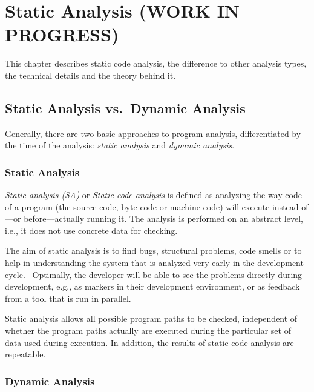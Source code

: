 \chapter{Static Analysis (WORK IN PROGRESS)}
\label{static-analysis}

This chapter describes static code analysis, the difference to other analysis types, the technical details and the theory behind it.

\section{Static Analysis vs.~Dynamic Analysis}

Generally, there are two basic approaches to program analysis, differentiated by the time of the analysis: \emph{static analysis} and \emph{dynamic analysis}.

\subsection{Static Analysis}

\emph{Static analysis (SA)} or \emph{Static code analysis} is defined as analyzing the way code of a program (the source code, byte code or machine code) will execute instead of---or before---actually running it. The analysis is performed on an abstract level, i.e., it does not use concrete data for checking.~\cite{static-code-analysis}

The aim of static analysis is to find bugs, structural problems, code smells or to help in understanding the system that is analyzed very early in the development cycle.~\cite{data-flow-analysis, chess-west} Optimally, the developer will be able to see the problems directly during development, e.g., as markers in their development environment, or as feedback from a tool that is run in parallel.

Static analysis allows all possible program paths to be checked, independent of whether the program paths actually are executed during the particular set of data used during execution. In addition, the results of static code analysis are repeatable.~\cite{coverity-report}

\subsection{Dynamic Analysis}

